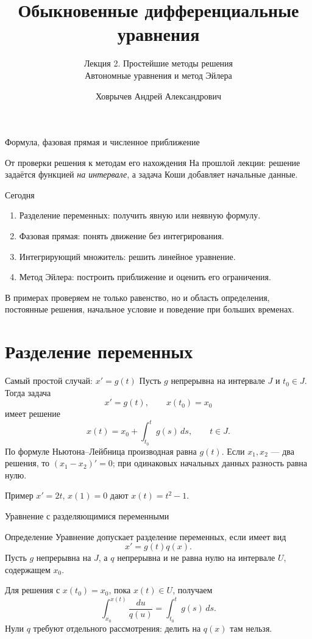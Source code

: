 \documentclass[aspectratio=169,11pt]{beamer}
\title[Простейшие методы]{Обыкновенные дифференциальные уравнения}
\subtitle{Лекция 2. Простейшие методы решения\\Автономные уравнения и метод Эйлера}
\author[Ховрычев А. А.]{Ховрычев Андрей Александрович}
\institute[УрФУ]{ФИИТ, УрФУ}
\date{}
\begin{document}
\begin{frame}
\titlepage
\centering Формула, фазовая прямая и численное приближение
\end{frame}

\begin{frame}{От проверки решения к методам его нахождения}
На прошлой лекции: решение задаётся функцией \emph{на интервале},
а задача Коши добавляет начальные данные.
\begin{block}{Сегодня}
\begin{enumerate}
\item Разделение переменных: получить явную или неявную формулу.
\item Фазовая прямая: понять движение без интегрирования.
\item Интегрирующий множитель: решить линейное уравнение.
\item Метод Эйлера: построить приближение и оценить его ограничения.
\end{enumerate}
\end{block}
В примерах проверяем не только равенство, но и область определения,
постоянные решения, начальное условие и поведение при больших временах.
\end{frame}

\section{Разделение переменных}
\begin{frame}{Самый простой случай: $x'=g(t)$}
Пусть $g$ непрерывна на интервале $J$ и $t_0\in J$.
Тогда задача
\[
x'=g(t),\qquad x(t_0)=x_0
\]
имеет решение
\[
\boxed{x(t)=x_0+\int_{t_0}^{t}g(s)\,ds},\qquad t\in J.
\]
По формуле Ньютона--Лейбница производная равна $g(t)$.
Если $x_1,x_2$ --- два решения, то $(x_1-x_2)'=0$;
при одинаковых начальных данных разность равна нулю.
\begin{exampleblock}{Пример}
$x'=2t$, $x(1)=0$ дают $x(t)=t^2-1$.
\end{exampleblock}
\end{frame}

\begin{frame}{Уравнение с разделяющимися переменными}
\begin{block}{Определение}
Уравнение допускает \alert{разделение переменных}, если имеет вид
\[
x'=g(t)q(x).
\]
Пусть $g$ непрерывна на $J$, а $q$ непрерывна и не равна нулю
на интервале $U$, содержащем $x_0$.
\end{block}
Для решения с $x(t_0)=x_0$, пока $x(t)\in U$, получаем
\[
\boxed{\int_{x_0}^{x(t)}\frac{du}{q(u)}
=\int_{t_0}^{t}g(s)\,ds}.
\]
Нули $q$ требуют отдельного рассмотрения: делить на $q(x)$ там нельзя.
\end{frame}
\end{document}
